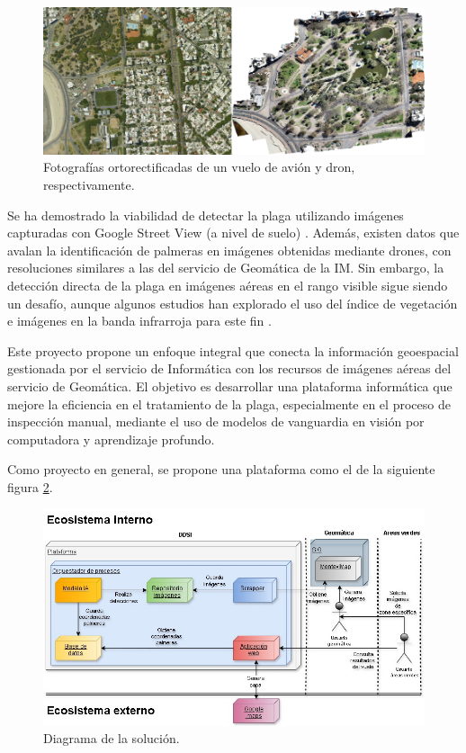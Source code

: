 \documentclass[
11pt, %
]{charter}
\begin{document}
\begin{figure}[H]
  \centering
  \includegraphics[width=.95\textwidth]{./Figuras/imagen-dron-y-avion.png}
  \caption{Fotografías ortorectificadas de un vuelo de avión y dron, respectivamente.}
  \label{fig:imagen-dron-y-avion}
\end{figure}

Se ha demostrado la viabilidad de detectar la plaga utilizando imágenes capturadas con Google Street View (a nivel de suelo) \cite{kagan2024}. Además, existen datos que avalan la identificación de palmeras en imágenes obtenidas mediante drones, con resoluciones similares a las del servicio de Geomática de la IM. Sin embargo, la detección directa de la plaga en imágenes aéreas en el rango visible sigue siendo un desafío, aunque algunos estudios han explorado el uso del índice de vegetación e imágenes en la banda infrarroja para este fin \cite{delalieux2023}.

Este proyecto propone un enfoque integral que conecta la información geoespacial gestionada por el servicio de Informática con los recursos de imágenes aéreas del servicio de Geomática. El objetivo es desarrollar una plataforma informática que mejore la eficiencia en el tratamiento de la plaga, especialmente en el proceso de inspección manual, mediante el uso de modelos de vanguardia en visión por computadora y aprendizaje profundo.

Como proyecto en general, se propone una plataforma como el de la siguiente figura \ref{fig:diagrama-inicial-solucion}.

\begin{figure}[H]
  \centering
  \includegraphics[width=.95\textwidth]{./Figuras/diagrama-inicial-solucion.jpg}
  \caption{Diagrama de la solución.}
  \label{fig:diagrama-inicial-solucion}
\end{figure}
\end{document}
